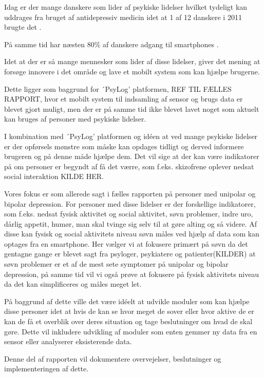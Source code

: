 Idag er der mange danskere som lider af psykiske lidelser hvilket tydeligt kan uddrages fra bruget af antidepressiv medicin idet at 1 af 12 danskere i 2011 brugte det \citep{misc:forbrugAntidepressiva}. 

På samme tid har næsten 80\% af danskere adgang til smartphones \citep{misc:dstElektronik}.

Idet at der er så mange mennesker som lider af disse lidelser, giver det mening at forsøge innovere i det område og lave et mobilt system som kan hjælpe brugerne.

Dette ligger som baggrund for ´PsyLog' platformen, REF TIL FÆLLES RAPPORT, hvor et mobilt system til indsamling af sensor og brugs data er blevet gjort muligt, men der er på samme tid ikke blevet lavet noget som aktuelt kan bruges af personer med psykiske lidelser.

I kombination med ´PsyLog' platformen og idéen at ved mange psykiske lidelser er der opførsels mønstre som måske kan opdages tidligt og derved informere brugeren og på denne måde hjælpe dem. 
Det vil sige at der kan være indikatorer på om personer er begyndt af få det værre, som f.eks. skizofrene oplever nedsat social interaktion KILDE HER.

Vores fokus er som allerede sagt i fælles rapporten på personer med unipolar og bipolar depression. 
For personer med disse lidelser er der forskellige indikatorer, som f.eks. nedsat fysisk aktivitet og social aktivitet, søvn problemer, indre uro, dårlig appetit, humør, man skal tvinge sig selv til at gøre alting og så videre.
Af disse kan fysisk og social aktivitets niveau søvn måles ved hjælp af data som kan optages fra en smartphone. 
Her vælger vi at fokusere primært på søvn da det gentagne gange er blevet sagt fra psyloger, psykiatere og patienter(KILDER) at søvn problemer er et af de mest sete symptomer på unipolar og bipolar depression, på samme tid vil vi også prøve at fokusere på fysisk aktivitets niveau da det kan simplificeres og måles meget let.

På baggrund af dette ville det være idéelt at udvikle moduler som kan hjælpe disse personer idet at hvis de kan se hvor meget de sover eller hvor aktive de er kan de få et overblik over deres situation og tage beslutninger om hvad de skal gøre. 
Dette vil inkludere udvikling af moduler som enten gemmer ny data fra en sensor eller analyserer eksisterende data.

Denne del af rapporten vil dokumentere overvejelser, beslutninger og implementeringen af dette.